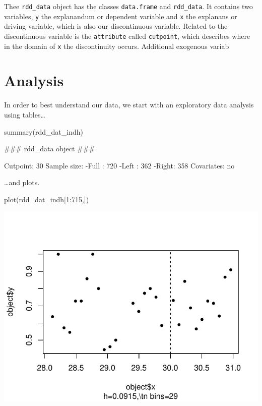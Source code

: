 \documentclass[article]{jss}
\begin{document}
Thee \texttt{rdd\_data} object has the classes \texttt{data.frame} and
\texttt{rdd\_data}. It contains two variables, \texttt{y} the
explanandum or dependent variable and \texttt{x} the explanans or
driving variable, which is also our discontinuous variable. Related to
the discontinuous variable is the \texttt{attribute} called
\texttt{cutpoint}, which describes where in the domain of \texttt{x} the
discontinuity occurs. Additional exogenous variab

\section{Analysis}\label{analysis}

In order to best understand our data, we start with an exploratory data
analysis using tables\ldots{}

\begin{CodeChunk}
\begin{CodeInput}
summary(rdd_dat_indh)
\end{CodeInput}
\begin{CodeOutput}
### rdd_data object ###

Cutpoint: 30 
Sample size: 
    -Full : 720 
    -Left : 362 
    -Right: 358
Covariates: no 
\end{CodeOutput}
\end{CodeChunk}

\ldots{}and plots.

\begin{CodeChunk}
\begin{CodeInput}
plot(rdd_dat_indh[1:715,])
\end{CodeInput}


\begin{center}\includegraphics{README_files/figure-latex/unnamed-chunk-6-1} \end{center}

\end{CodeChunk}
\end{document}
